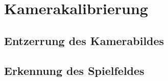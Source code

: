 \section{Kamerakalibrierung}

\subsection{Entzerrung des Kamerabildes}

\subsection{Erkennung des Spielfeldes}

